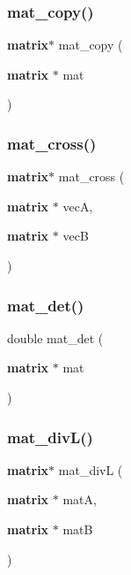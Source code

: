 \mbox{\label{mat_lib_8h_a6e305d7834e8fd47606af3747982dd58}} 
\subsubsection{mat\+\_\+copy()}
{\footnotesize\ttfamily \textbf{ matrix}$\ast$ mat\+\_\+copy (\begin{DoxyParamCaption}\item[{\textbf{ matrix} $\ast$}]{mat }\end{DoxyParamCaption})}

\mbox{\label{mat_lib_8h_a7a20732151d619bc4ea0c93772c1ea27}} 
\subsubsection{mat\+\_\+cross()}
{\footnotesize\ttfamily \textbf{ matrix}$\ast$ mat\+\_\+cross (\begin{DoxyParamCaption}\item[{\textbf{ matrix} $\ast$}]{vecA,  }\item[{\textbf{ matrix} $\ast$}]{vecB }\end{DoxyParamCaption})}

\mbox{\label{mat_lib_8h_ad1efccfd1327feb2fb70ed5489a62f97}} 
\subsubsection{mat\+\_\+det()}
{\footnotesize\ttfamily double mat\+\_\+det (\begin{DoxyParamCaption}\item[{\textbf{ matrix} $\ast$}]{mat }\end{DoxyParamCaption})}

\mbox{\label{mat_lib_8h_a3861563cc324059c0b3383c0fcc1084b}} 
\subsubsection{mat\+\_\+div\+L()}
{\footnotesize\ttfamily \textbf{ matrix}$\ast$ mat\+\_\+divL (\begin{DoxyParamCaption}\item[{\textbf{ matrix} $\ast$}]{matA,  }\item[{\textbf{ matrix} $\ast$}]{matB }\end{DoxyParamCaption})}

